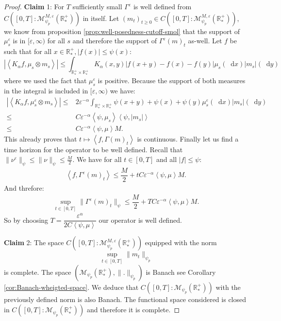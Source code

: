 \documentclass[11pt,a4paper]{article}
\newcommand{\RRP}{\mathbb{R}^+_*}
\newcommand{\MC}{\mathcal{M}}
\newcommand{\Proc}[1]{\left(#1\right)_{t\geq 0}}
\newcommand{\brac}[1]{\left\langle#1\right\rangle}
\newcommand{\dd}{\mathop{}\!\mathrm{d}}
\begin{document}
\begin{proof}
    \textbf{Claim} 1: For $T$ sufficiently small $\Gamma^\varepsilon$ is well defined from \(C\left([0,T]:\MC^{M,\varepsilon}_{\psi_p}\left(\RRP\right) \right) \) in itself. Let $\Proc{m_t} \in C\left([0,T]:\MC^{M,\varepsilon}_{\psi_p}\left(\RRP\right) \right)$, we know from proposition \ref{prop:well-posedness-cutoff-smol} that the support of $\mu^\varepsilon_s$ is in $[\varepsilon,\infty)$ for all $s$ and therefore the support of $\Gamma^\varepsilon(m)_t$ as-well. Let $f$ be such that for all $x\in \RRP, |f(x)| \leq \psi(x)$:
    \[ \left|\brac{K_\alpha f,\mu_s\otimes m_s}\right| \leq \int_{\RRP\times \RRP} K_\alpha(x,y) \left|f(x+y) - f(x) -f(y)\right| \mu_s(\dd x)|m_s|(\dd y)
    \]
    where we used the fact that $\mu^\varepsilon_s $ is positive. Because the support of both measures in the integral is included in $[\varepsilon,\infty)$ we have:
    \begin{align*}
        \left|\brac{K_\alpha f,\mu^\varepsilon_s\otimes m_s}\right| \leq& 2\varepsilon^{-\alpha} \int_{\RRP\times \RRP} \psi(x+y) + \psi(x) + \psi(y)\mu^\varepsilon_s(\dd x)|m_s|(\dd y) \\
        \leq& C\varepsilon^{-\alpha}\brac{\psi,\mu_s} \brac{\psi,|m_s|}\\
        \leq& C\varepsilon^{-\alpha}\brac{\psi,\mu} M.
    \end{align*}
    This already proves that $t\mapsto \brac{f,\Gamma(m)_t}$ is continuous. Finally let us find a time horizon for the operator to be well defined. Recall that $\| \nu^\varepsilon\|_{\psi} \leq \| \nu\|_{\psi} \leq \frac{M}{2}$. We have for all $t \in [0,T]$ and all $|f|\leq \psi$:
    \begin{align*}
        \brac{f,\Gamma^\varepsilon(m)_t} \leq \dfrac{M}{2} + tC\varepsilon^{-\alpha}\brac{\psi,\mu} M.
    \end{align*}
    And threfore:
    \begin{align*}
        \sup\limits_{t\in [0,T]} \| \Gamma^\varepsilon(m)_t\|_{\psi} \leq \dfrac{M}{2} + TC\varepsilon^{-\alpha}\brac{\psi,\mu} M.
    \end{align*}
    So by choosing $T = \dfrac{\varepsilon^{\alpha}}{2C\brac{\psi,\mu}}$ our operator is well defined.

    \textbf{Claim} 2: The space \(C\left([0,T]:\MC^{M,\varepsilon}_{\psi_p}\left(\RRP\right) \right) \) equipped with the norm 
     \[
    \sup\limits_{t \in [0,T]} \|m_t\|_{\psi_p}
    \]
    is complete. The space \(\left(\MC_{\psi_p}\left(\RRP\right),\|.\|_{\psi_p}\right)\) is Banach see Corollary \ref{cor:Banach-wheigted-space}. We deduce that \(C\left([0,T]:\MC_{\psi_p}\left(\RRP\right) \right) \) with the previously defined norm is also Banach. The functional space considered is closed in \(C\left([0,T]:\MC_{\psi_p}\left(\RRP\right) \right) \) and therefore it is complete.  
    

\end{proof}
\end{document}
